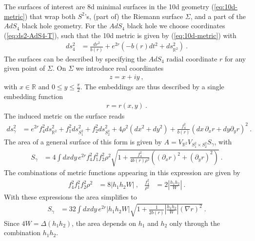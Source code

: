 \documentclass[aps,prd,11pt,notitlepage,longbibliography,nofootinbib,tightenlines,preprintnumbers]{revtex4-1}
\def\RR{{\mathds{R}}}
\begin{document}
The surfaces of interest are 8d minimal surfaces in the 10d geometry (\ref{eq:10d-metric}) that wrap both $S^2$'s, (part of) the Riemann surface $\Sigma$, and a part of the $AdS_4$ black hole geometry.
For the $AdS_4$ black hole we choose coordinates (\ref{eq:ds2-AdS4-T}), such that the 10d metric is given by (\ref{eq:10d-metric}) with
\begin{align}
		ds_4^2&=\frac{dr^2}{b(r)}+e^{2r}\left(-b(r)dt^2+ds^2_{\RR^2}\right)~.
\end{align}
The surfaces can be described by specifying the $AdS_4$ radial coordinate $r$ for any given point of $\Sigma$.
On $\Sigma$ we introduce real coordinates
\begin{align}
	z=x+iy~,
\end{align}
with $x\in\mathds{R}$ and $0\leq y\leq\frac{\pi}{2}$.
The embeddings are thus described by a single embedding function
\begin{align}
	r=r(x,y)~.
\end{align}
The induced metric on the surface reads
\begin{align}\label{eq:ind-met}
	ds^2_\gamma&=e^{2r}f_4^2ds^2_{\RR^2}+f_1^2ds^2_{S_1^2}+f_2^2ds^2_{S^2_2}+4\rho^2 (dx^2+dy^2)
	+\frac{f_4^2}{b(r)}\left(dx\, \partial_x r +dy \partial_y r \right)^2~.
\end{align}
The area of a general surface of this form is given by $A=V_{\RR^2}V_{S_1^2\times S_2^2}S_\gamma$, with
\begin{align}
	S_\gamma&=4\int dx dy \,e^{2r}f_4^2f_1^2f_2^2\rho^2\sqrt{1+\frac{f_4^2}{4b(r)\rho^2}\left((\partial_x r)^2+(\partial_y r)^2\right)}~.
\end{align}
The combinations of metric functions appearing in this expression are given by
\begin{align}\label{eq:fg-eval}
	f_4^2 f_1^2f_2^2\rho^2&=8\left|h_1 h_2 W\right|~,
	&
	\frac{f_4^2}{\rho^2}&=2\left|\frac{h_1h_2}{W}\right|~.
\end{align}
With these expressions the area simplifies to
\begin{align}\label{eq:S}
	S_\gamma&=32\int dx dy \,e^{2r}\left|h_1 h_2 W\right|\sqrt{1+\frac{1}{2b(r)}\left|\frac{h_1 h_2}{W}\right| (\nabla r)^2}~.
\end{align}
Since $4W=\Delta(h_1h_2)$, the area depends on $h_1$ and $h_2$ only through the combination $h_1h_2$.
\end{document}
